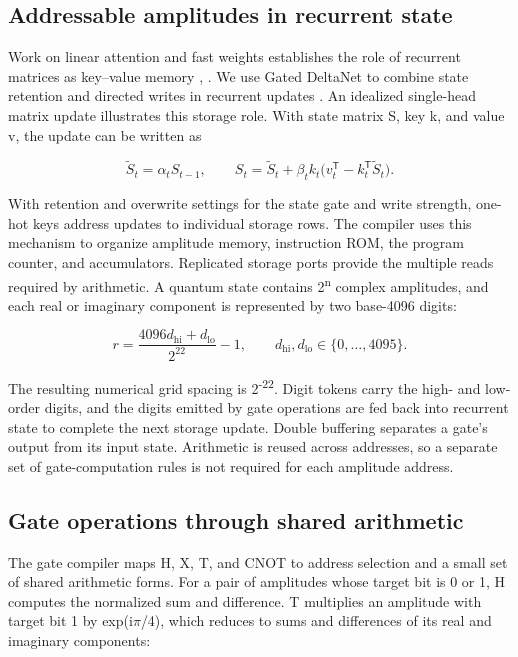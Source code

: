 \documentclass[11pt,a4paper]{article}
\begin{document}
\subsection{Addressable amplitudes in recurrent state}

Work on linear attention and fast weights establishes the role of recurrent matrices as key--value memory \cite{ref11}, \cite{ref12}. We use Gated DeltaNet to combine state retention and directed writes in recurrent updates \cite{ref13}. An idealized single-head matrix update illustrates this storage role. With state matrix S, key k, and value v, the update can be written as

\begin{equation}
\widetilde S_t=\alpha_t S_{t-1},\qquad
S_t=\widetilde S_t+\beta_t k_t\bigl(v_t^{\mathsf T}-k_t^{\mathsf T}\widetilde S_t\bigr).
\end{equation}

With retention and overwrite settings for the state gate and write strength, one-hot keys address updates to individual storage rows. The compiler uses this mechanism to organize amplitude memory, instruction ROM, the program counter, and accumulators. Replicated storage ports provide the multiple reads required by arithmetic. A quantum state contains 2\textsuperscript{n} complex amplitudes, and each real or imaginary component is represented by two base-4096 digits:

\begin{equation}
r=\frac{4096d_{\mathrm{hi}}+d_{\mathrm{lo}}}{2^{22}}-1,
\qquad d_{\mathrm{hi}},d_{\mathrm{lo}}\in\{0,\ldots,4095\}.
\end{equation}

The resulting numerical grid spacing is 2\textsuperscript{-22}. Digit tokens carry the high- and low-order digits, and the digits emitted by gate operations are fed back into recurrent state to complete the next storage update. Double buffering separates a gate's output from its input state. Arithmetic is reused across addresses, so a separate set of gate-computation rules is not required for each amplitude address.

\subsection{Gate operations through shared arithmetic}

The gate compiler maps H, X, T, and CNOT to address selection and a small set of shared arithmetic forms. For a pair of amplitudes whose target bit is 0 or 1, H computes the normalized sum and difference. T multiplies an amplitude with target bit 1 by exp(i\ensuremath{\pi}/4), which reduces to sums and differences of its real and imaginary components:
\end{document}
